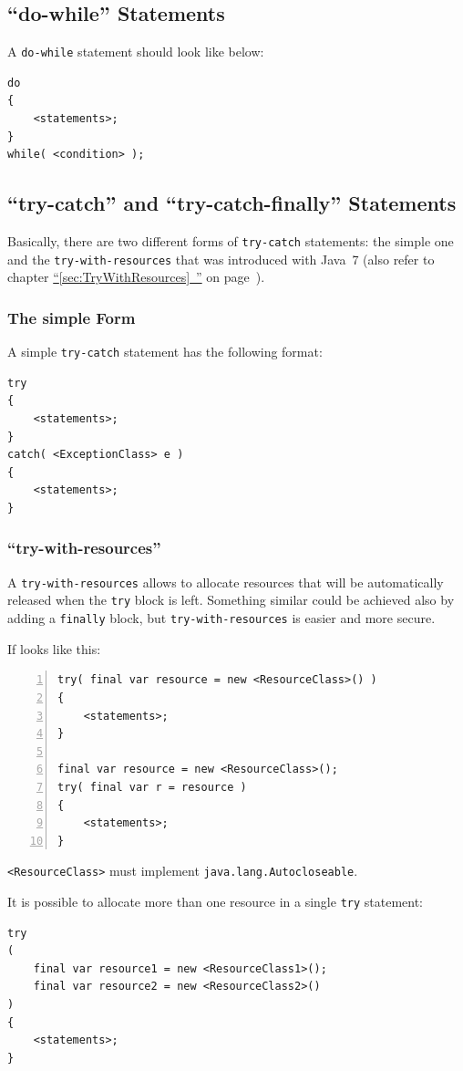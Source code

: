 \documentclass[11pt,a4paper, titlepage, parskip=half, headsepline, footsepline, cleardoublepage=current, headheight=1cm]{scrbook}
\newcommand*{\tqfullvref}[1]{\hyperref[{#1}]{“\ref*{#1}~\nameref*{#1}”} on page~\pageref{#1}}
\begin{document}
\subsection{“do-while” Statements}
A \lstinline|do-while| statement should look like below:
\begin{lstlisting}
do
{
    <statements>;
}
while( <condition> );
\end{lstlisting}

\subsection{“try-catch” and “try-catch-finally” Statements}
Basically, there are two different forms of \lstinline|try-catch| statements: the simple one and the \lstinline|try-with-resources| that was introduced with Java~7 (also refer to chapter \tqfullvref{sec:TryWithResources}).

\subsubsection{The simple Form}
A simple \lstinline|try-catch| statement has the following format:
\begin{lstlisting}
try
{
    <statements>;
}
catch( <ExceptionClass> e )
{
    <statements>;
}
\end{lstlisting}

\subsubsection{“try-with-resources”}
A \lstinline|try-with-resources| allows to allocate resources that will be automatically released when the \lstinline|try| block is left. Something similar could be achieved also by adding a \lstinline|finally| block, but \lstinline|try-with-resources| is easier and more secure.

If looks like this:

\begin{lstlisting}[numbers=left]
try( final var resource = new <ResourceClass>() )
{
    <statements>;
}

final var resource = new <ResourceClass>();
try( final var r = resource )
{
    <statements>;
}
\end{lstlisting}

\lstinline|<ResourceClass>| must implement \lstinline|java.lang.Autocloseable|.

It is possible to allocate more than one resource in a single \lstinline|try| statement:
\begin{lstlisting}
try
( 
    final var resource1 = new <ResourceClass1>(); 
    final var resource2 = new <ResourceClass2>() 
)
{
    <statements>;
}
\end{lstlisting}
\end{document}
